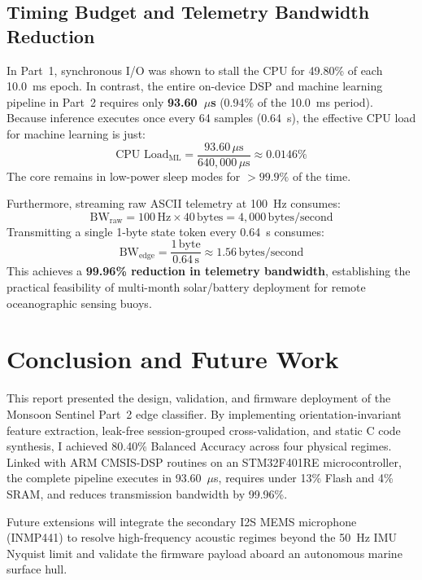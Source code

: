 \documentclass[twocolumn]{article}
\begin{document}
\subsection{Timing Budget and Telemetry Bandwidth Reduction}
In Part~1, synchronous I/O was shown to stall the CPU for 49.80\% of each 10.0~ms epoch. In contrast, the entire on-device DSP and machine learning pipeline in Part~2 requires only \textbf{93.60~$\mu$s} (0.94\% of the 10.0~ms period). Because inference executes once every 64 samples (0.64~s), the effective CPU load for machine learning is just:
\begin{equation}
    \text{CPU Load}_{\text{ML}} = \frac{93.60\,\mu\text{s}}{640,000\,\mu\text{s}} \approx 0.0146\%
\end{equation}
The core remains in low-power sleep modes for $>99.9\%$ of the time.

Furthermore, streaming raw ASCII telemetry at 100~Hz consumes:
\begin{equation}
    \text{BW}_{\text{raw}} = 100\,\text{Hz} \times 40\,\text{bytes} = 4,000\,\text{bytes/second}
\end{equation}
Transmitting a single 1-byte state token every 0.64~s consumes:
\begin{equation}
    \text{BW}_{\text{edge}} = \frac{1\,\text{byte}}{0.64\,\text{s}} \approx 1.56\,\text{bytes/second}
\end{equation}
This achieves a \textbf{99.96\% reduction in telemetry bandwidth}, establishing the practical feasibility of multi-month solar/battery deployment for remote oceanographic sensing buoys.

\section{Conclusion and Future Work}
This report presented the design, validation, and firmware deployment of the Monsoon Sentinel Part~2 edge classifier. By implementing orientation-invariant feature extraction, leak-free session-grouped cross-validation, and static C code synthesis, I achieved 80.40\% Balanced Accuracy across four physical regimes. Linked with ARM CMSIS-DSP routines on an STM32F401RE microcontroller, the complete pipeline executes in 93.60~$\mu$s, requires under 13\% Flash and 4\% SRAM, and reduces transmission bandwidth by 99.96\%.

Future extensions will integrate the secondary I2S MEMS microphone (INMP441) to resolve high-frequency acoustic regimes beyond the 50~Hz IMU Nyquist limit and validate the firmware payload aboard an autonomous marine surface hull.
\end{document}
